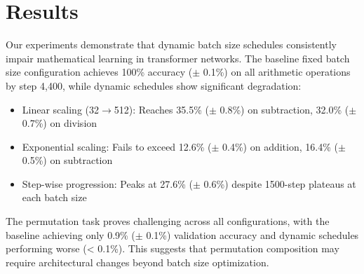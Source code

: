 \documentclass{article} %
\begin{document}
\section{Results}
\label{sec:results}

Our experiments demonstrate that dynamic batch size schedules consistently impair mathematical learning in transformer networks. The baseline fixed batch size configuration achieves 100\% accuracy ($\pm$ 0.1\%) on all arithmetic operations by step 4,400, while dynamic schedules show significant degradation:

\begin{itemize}
    \item Linear scaling (32$\rightarrow$512): Reaches 35.5\% ($\pm$ 0.8\%) on subtraction, 32.0\% ($\pm$ 0.7\%) on division
    \item Exponential scaling: Fails to exceed 12.6\% ($\pm$ 0.4\%) on addition, 16.4\% ($\pm$ 0.5\%) on subtraction
    \item Step-wise progression: Peaks at 27.6\% ($\pm$ 0.6\%) despite 1500-step plateaus at each batch size
\end{itemize}

The permutation task proves challenging across all configurations, with the baseline achieving only 0.9\% ($\pm$ 0.1\%) validation accuracy and dynamic schedules performing worse (< 0.1\%). This suggests that permutation composition may require architectural changes beyond batch size optimization.
\end{document}
